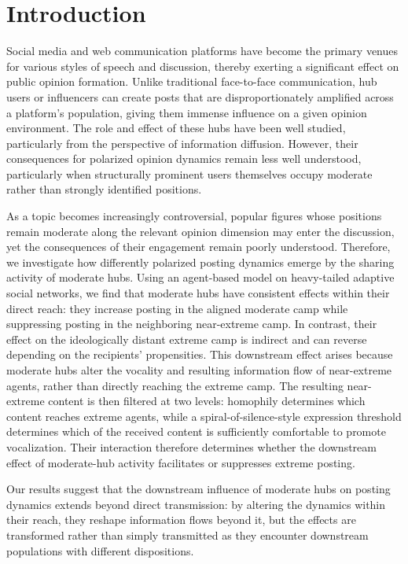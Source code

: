 \documentclass{svproc}
\def\Blue{\color[rgb]{0,0,1}}
\def\Dgreen{\color[rgb]{0.02,0.55,0.04}}
\begin{document}
\section{Introduction}\label{sec:intro}
Social media and web communication platforms have become the primary
venues for various styles of speech and discussion, 
thereby exerting a significant effect on
public opinion formation. Unlike traditional face-to-face
communication, hub users or influencers 
can create posts that are disproportionately amplified
across a platform's population, giving them immense influence on a
given opinion environment. The role and effect of these hubs have been
well studied,
particularly from the perspective of information diffusion. 
However, their consequences for polarized opinion dynamics 
remain less well understood, particularly when 
structurally prominent users themselves occupy 
moderate rather than strongly identified positions.
\par

\Dgreen
As a topic becomes increasingly controversial, popular figures 
whose positions remain moderate along the relevant 
opinion dimension may enter the discussion, 
yet the consequences of their engagement 
remain poorly understood.
Therefore, we investigate how differently polarized posting dynamics
emerge by the sharing activity of moderate hubs.
Using an
agent-based model on heavy-tailed adaptive social networks, we find
that moderate hubs have consistent effects within their direct reach:
they increase posting in the aligned moderate camp while suppressing
posting in the neighboring near-extreme camp. In contrast, their effect
on the ideologically distant extreme camp is indirect and can reverse
depending on the recipients' propensities.
This downstream effect arises because moderate hubs alter the
vocality and resulting information flow of near-extreme agents, rather
than directly reaching the extreme camp. The resulting near-extreme
content is then filtered at two levels: homophily determines
which content reaches extreme agents, while a spiral-of-silence-style
expression threshold determines which of the received content is
sufficiently comfortable to promote vocalization. Their interaction therefore determines whether
the downstream effect of moderate-hub activity facilitates or suppresses
extreme posting.

\par

Our results suggest that the downstream influence of moderate hubs 
on posting dynamics extends beyond
direct transmission: by altering the dynamics within their reach, they
reshape information flows beyond it, but the effects are transformed
rather than simply transmitted as they encounter downstream populations
with different dispositions. 
\Blue
\end{document}
